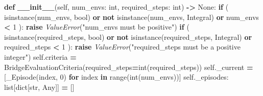 \documentclass[
  american,
  11pt,
  letterpaper,
]{article}
\newenvironment{Shaded}{\begin{snugshade}}{\end{snugshade}}
\newcommand{\BuiltInTok}[1]{#1}
\newcommand{\ControlFlowTok}[1]{\textcolor[rgb]{0.13,0.29,0.53}{\textbf{#1}}}
\newcommand{\DecValTok}[1]{\textcolor[rgb]{0.00,0.00,0.81}{#1}}
\newcommand{\FunctionTok}[1]{\textcolor[rgb]{0.13,0.29,0.53}{\textbf{#1}}}
\newcommand{\KeywordTok}[1]{\textcolor[rgb]{0.13,0.29,0.53}{\textbf{#1}}}
\newcommand{\NormalTok}[1]{#1}
\newcommand{\OperatorTok}[1]{\textcolor[rgb]{0.81,0.36,0.00}{\textbf{#1}}}
\newcommand{\PreprocessorTok}[1]{\textcolor[rgb]{0.56,0.35,0.01}{\textit{#1}}}
\newcommand{\StringTok}[1]{\textcolor[rgb]{0.31,0.60,0.02}{#1}}
\newcommand{\VariableTok}[1]{\textcolor[rgb]{0.00,0.00,0.00}{#1}}
\renewenvironment{Shaded}{\par\smallskip}{\par\smallskip}
\begin{document}
\begin{Shaded}
\begin{Highlighting}[]
    \KeywordTok{def} \FunctionTok{\_\_init\_\_}\NormalTok{(}\VariableTok{self}\NormalTok{, num\_envs: }\BuiltInTok{int}\NormalTok{, required\_steps: }\BuiltInTok{int}\NormalTok{) }\OperatorTok{{-}\textgreater{}} \VariableTok{None}\NormalTok{:}
        \ControlFlowTok{if}\NormalTok{ (}
            \BuiltInTok{isinstance}\NormalTok{(num\_envs, }\BuiltInTok{bool}\NormalTok{)}
            \KeywordTok{or} \KeywordTok{not} \BuiltInTok{isinstance}\NormalTok{(num\_envs, Integral)}
            \KeywordTok{or}\NormalTok{ num\_envs }\OperatorTok{\textless{}} \DecValTok{1}
\NormalTok{        ):}
            \ControlFlowTok{raise} \PreprocessorTok{ValueError}\NormalTok{(}\StringTok{"num\_envs must be positive"}\NormalTok{)}
        \ControlFlowTok{if}\NormalTok{ (}
            \BuiltInTok{isinstance}\NormalTok{(required\_steps, }\BuiltInTok{bool}\NormalTok{)}
            \KeywordTok{or} \KeywordTok{not} \BuiltInTok{isinstance}\NormalTok{(required\_steps, Integral)}
            \KeywordTok{or}\NormalTok{ required\_steps }\OperatorTok{\textless{}} \DecValTok{1}
\NormalTok{        ):}
            \ControlFlowTok{raise} \PreprocessorTok{ValueError}\NormalTok{(}\StringTok{"required\_steps must be a positive integer"}\NormalTok{)}
        \VariableTok{self}\NormalTok{.criteria }\OperatorTok{=}\NormalTok{ BridgeEvaluationCriteria(required\_steps}\OperatorTok{=}\BuiltInTok{int}\NormalTok{(required\_steps))}
        \VariableTok{self}\NormalTok{.\_current }\OperatorTok{=}\NormalTok{ [\_Episode(index, }\DecValTok{0}\NormalTok{) }\ControlFlowTok{for}\NormalTok{ index }\KeywordTok{in} \BuiltInTok{range}\NormalTok{(}\BuiltInTok{int}\NormalTok{(num\_envs))]}
        \VariableTok{self}\NormalTok{.\_episodes: }\BuiltInTok{list}\NormalTok{[}\BuiltInTok{dict}\NormalTok{[}\BuiltInTok{str}\NormalTok{, Any]] }\OperatorTok{=}\NormalTok{ []}


\end{Highlighting}
\end{Shaded}
\end{document}
